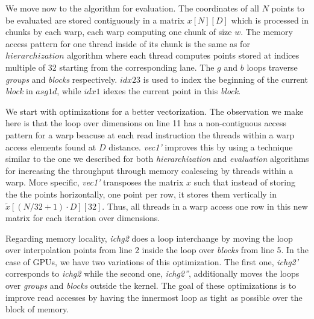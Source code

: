 We move now to the algorithm for evaluation. The coordinates of all $N$ points
to be evaluated are stored contiguously in a matrix $x[N][D]$ which is processed
in chunks by each warp, each warp computing one chunk of size $w$. The memory
access pattern for one thread inside of its chunk is the same as for
$hierarchization$ algorithm where each thread computes points stored at indices
multiple of 32 starting from the corresponding lane. The $g$ and $b$ loops
traverse \textit{groups} and \textit{blocks} respectively. $\textit{idx23}$ is
used to index the beginning of the current \textit{block} in $\textit{asg1d}$,
while $idx1$ idexes the current point in this \textit{block}.

We start with optimizations for a better vectorization. The observation we make
here is that the loop over dimensions on line 11 has a non-contiguous access
pattern for a warp beacuse at each read instruction the threads within a
warp access elements found at $D$ distance. \textit{vec1'} improves this by
using a technique similar to the one we described for both
\textit{hierarchization} and \textit{evaluation} algorithms for increasing
the throughput through memory coalescing by threads within a warp. More
specific, \textit{vec1'} transposes the matrix $x$ such that instead of storing
the the points horizontally, one point per row, it stores them vertically in
$\tilde{x}[(N/32+1) \cdot D][32]$. Thus, all threads in a warp access one row in
this new matrix for each iteration over dimensions.

Regarding memory locality, \textit{ichg2} does a loop interchange by moving the
loop over interpolation points from line 2 inside the loop over \textit{blocks}
from line 5. In the case of GPUs, we have two variations of this optimization.
The first one, \textit{ichg2'} corresponds to \textit{ichg2} while the second
one, \textit{ichg2''}, additionally moves the loops over \textit{groups}
and \textit{blocks} outside the kernel. The goal of these optimizations is to
improve read accesses by having the innermost loop as tight as possible over the
block of memory.

